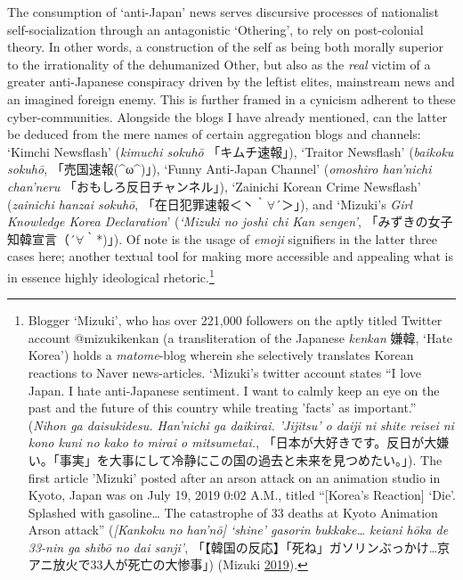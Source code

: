 \documentclass[10pt,british,A4paper,,openany]{memoir}
\begin{document}
The consumption of `anti-Japan' news serves discursive processes of
nationalist self-socialization through an antagonistic `Othering', to
rely on post-colonial theory. In other words, a construction of the self
as being both morally superior to the irrationality of the dehumanized
Other, but also as the \emph{real} victim of a greater anti-Japanese
conspiracy driven by the leftist elites, mainstream news and an imagined
foreign enemy. This is further framed in a cynicism adherent to these
cyber-communities. Alongside the blogs I have already mentioned, can the
latter be deduced from the mere names of certain aggregation blogs and
channels: `Kimchi Newsflash' (\emph{kimuchi sokuhō} 「キムチ速報」),
`Traitor Newsflash' (\emph{baikoku sokuhō}, 「売国速報(\^{}ω\^{})」),
`Funny Anti-Japan Channel' (\emph{omoshiro han'nichi chan'neru}
「おもしろ反日チャンネル」), `Zainichi Korean Crime Newsflash'
(\emph{zainichi hanzai sokuhō}, 「在日犯罪速報＜丶｀\(\forall\)´＞」),
and `Mizuki's \emph{Girl Knowledge Korea Declaration}' (\emph{`Mizuki no
joshi chi Kan sengen'}, 「みずきの女子知韓宣言（´\(\forall\)｀*)」). Of
note is the usage of \emph{emoji} signifiers in the latter three cases
here; another textual tool for making more accessible and appealing what
is in essence highly ideological rhetoric.\footnote{Blogger `Mizuki',
  who has over 221,000 followers on the aptly titled Twitter account
  @mizukikenkan (a transliteration of the Japanese \emph{kenkan} 嫌韓,
  `Hate Korea') holds a \emph{matome}-blog wherein she selectively
  translates Korean reactions to Naver news-articles. `Mizuki's twitter
  account states ``I love Japan. I hate anti-Japanese sentiment. I want
  to calmly keep an eye on the past and the future of this country while
  treating 'facts' as important.'' (\emph{Nihon ga daisukidesu.
  Han'nichi ga daikirai. 'Jijitsu' o daiji ni shite reisei ni kono kuni
  no kako to mirai o mitsumetai.},
  「日本が大好きです。反日が大嫌い。「事実」を大事にして冷静にこの国の過去と未来を見つめたい。」).
  The first article 'Mizuki' posted after an arson attack on an
  animation studio in Kyoto, Japan was on July 19, 2019 0:02 A.M.,
  titled ``{[}Korea's Reaction{]} `Die'. Splashed with gasoline\ldots{}
  The catastrophe of 33 deaths at Kyoto Animation Arson attack''
  (\emph{{[}Kankoku no han'nō{]} `shine' gasorin bukkake\ldots{} keiani
  hōka de 33-nin ga shibō no dai sanji'},
  「【韓国の反応】「死ね」ガソリンぶっかけ\ldots{}京アニ放火で33人が死亡の大惨事」)
  (Mizuki \protect\hyperlink{ref-mizuki_eng._2019}{2019}).}
\end{document}
